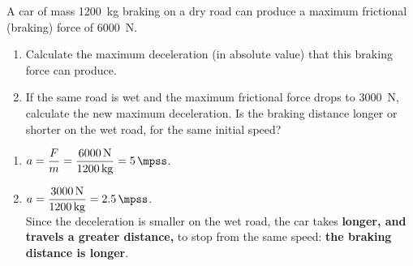 \begin{exercise}
    A car of mass \qty{1200}{\kg} braking on a dry road can produce a maximum frictional (braking) force of \qty{6000}{\newton}.
    \begin{enumerate}[label=\letraminuscula]
        \item Calculate the maximum deceleration (in absolute value) that this braking force can produce.
        \item If the same road is wet and the maximum frictional force drops to \qty{3000}{\newton}, calculate the new maximum deceleration. Is the braking distance longer or shorter on the wet road, for the same initial speed?
    \end{enumerate}
    \begin{solu}
        \begin{enumerate}[label=\alph*)]
            \item \(a = \dfrac{F}{m} = \dfrac{\qty{6000}{\newton}}{\qty{1200}{\kg}} = \qty{5}{\mpss}\).
            \item \(a = \dfrac{\qty{3000}{\newton}}{\qty{1200}{\kg}} = \qty{2.5}{\mpss}\). \\
            Since the deceleration is smaller on the wet road, the car takes \textbf{longer, and travels a greater distance,} to stop from the same speed: \textbf{the braking distance is longer}.
        \end{enumerate}
    \end{solu}
\end{exercise}

